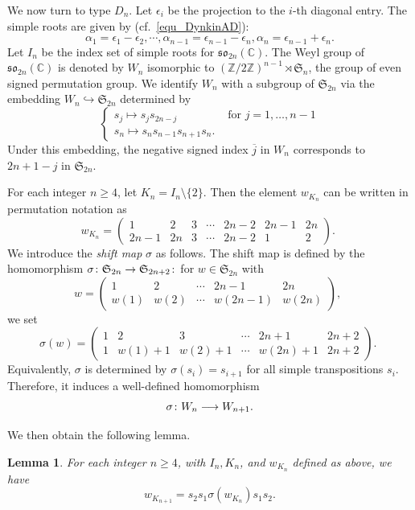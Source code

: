 \documentclass[11pt]{amsart}
\newcommand{\C}{\mathbb{C}}
\newcommand{\Z}{\mathbb{Z}}
\def\frak{\mathfrak}
\numberwithin{equation}{section}
\theoremstyle{plain}
\newtheorem{lemma}[theorem]{Lemma}
\theoremstyle{definition}
\def\to{\mathchoice{\longrightarrow}{\rightarrow}{\rightarrow}{\rightarrow}}
\numberwithin{equation}{section}
\begin{document}
We now turn to type $D_n$. Let $\epsilon_i$ be the projection to the $i$-th diagonal entry. The simple roots are given by (cf.~\eqref{equ_DynkinAD})$\colon$
$$
\alpha_1 = \epsilon_1 - \epsilon_2, \cdots, \alpha_{n-1} = \epsilon_{n-1} - \epsilon_n, \alpha_n = \epsilon_{n-1} + \epsilon_n.
$$
Let $I_n$ be the index set of simple roots for $\frak{so}_{2n}(\C)$. The Weyl group of $\frak{so}_{2n}(\C)$ is denoted by $W_{n}$ isomorphic to $(\Z / 2\Z)^{n-1} \rtimes \mathfrak{S}_n$, the group of even signed permutation group. We identify $W_{n}$ with a subgroup of $\mathfrak{S}_{2n}$ via the embedding $W_{n} \hookrightarrow \mathfrak{S}_{2n}$ determined by
$$
\begin{cases}
s_j \mapsto s_j s_{2n-j} \, &\mbox{ for $j = 1, \dots, n-1$} \\
s_n  \mapsto s_n s_{n-1} s_{n+1} s_n. &
\end{cases}
$$
Under this embedding, the negative signed index $\overline{j}$ in $W_{n}$ corresponds to $2n+1-j$ in $\mathfrak{S}_{2n}$.

For each integer $n \geq 4$, let $K_{n} = I_n \setminus \{2\}$. Then the element $w_{K_{n}}$ can be written in permutation notation as
$$
w_{K_{n}} = 
\left(\begin{array}{cc|ccc|cc}
1 & 2 & 3 & \cdots & 2n-2 & 2n-1& 2n \\
2n-1  & 2n & 3 & \cdots & 2n-2 & 1 & 2
\end{array}\right). \,\,
$$
We introduce the \emph{shift map} $\sigma$ as follows. The shift map is defined by the homomorphism $\sigma \colon \frak{S}_{2n} \to \frak{S}_{2n+2}$$\colon$ for $w \in \frak{S}_{2n}$ with
$$
w = 
\left(\begin{array}{ccccc}
1 & 2 & \cdots &  2n-1& 2n \\
w(1)  & w(2)  & \cdots & w(2n-1) & w(2n)
\end{array}\right), \,\,
$$ 
we set
$$
\sigma(w) = 
\left(\begin{array}{cccccc}
1& 2 & 3 & \cdots &  2n+1& 2n+2 \\
1 & w(1) +1 & w(2) + 1 & \cdots & w(2n) +1 & 2n+2
\end{array}\right). \,\,
$$
Equivalently, $\sigma$ is determined by $\sigma(s_i) = s_{i+1}$ for all simple transpositions $s_i$. Therefore, it induces a well-defined homomorphism
$$
\sigma \colon W_{n} \to W_{{n+1}}.
$$

We then obtain the following lemma.

\begin{lemma}\label{lemma_dn1}
For each integer $n \geq 4$, with $I_n, K_n$, and $w_{K_n}$ defined as above, we have 
\begin{equation}\label{exp_dn1}
w_{K_{n+1}} = s_{2} s_{1} \sigma(w_{K_{n}}) s_{1} s_2.
\end{equation}
\end{lemma}
\end{document}
